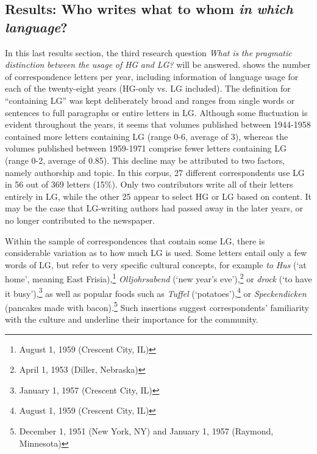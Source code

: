 \documentclass[output=paper]{langsci/langscibook}
\begin{document}
\subsection{Results: Who writes what to whom \textit{in} \textit{which} \textit{language}?} %
\label{sec:rocker:4.3}

 
In this last results section, the third research question \textit{What} \textit{is} \textit{the} \textit{pragmatic} \textit{distinction} \textit{between} \textit{the} \textit{usage} \textit{of} \textit{HG} \textit{and} \textit{LG?} will be answered.  shows the number of correspondence letters per year, including information of language usage for each of the twenty-eight years (HG-only vs. LG included). The definition for “containing LG” was kept deliberately broad and ranges from single words or sentences to full paragraphs or entire letters in LG. Although some fluctuation is evident throughout the years, it seems that volumes published between 1944-1958 contained more letters containing LG (range 0-6, average of 3), whereas the volumes published between 1959-1971 comprise fewer letters containing LG (range 0-2, average of 0.85). This decline may be attributed to two factors, namely authorship and topic. In this corpus, 27 different correspondents use LG in 56 out of 369 letters (15\%). Only two contributors write all of their letters entirely in LG, while the other 25 appear to select HG or LG based on content. It may be the case that LG-writing authors had passed away in the later years, or no longer contributed to the newspaper. 
 

 
Within the sample of correspondences that contain some LG, there is considerable variation as to how much LG is used. Some letters entail only a few words of LG, but refer to very specific cultural concepts, for example \textit{to} \textit{Hus} (‘at home’, meaning East Frisia),\footnote{August 1, 1959 (Crescent City, IL)} \textit{Olljohrsabend} (‘new year’s eve’),\footnote{April 1, 1953 (Diller, Nebraska)} or \textit{drock} (‘to have it busy’),\footnote{January 1, 1957 (Crescent City, IL)} as well as popular foods such as \textit{Tuffel} (‘potatoes’),\footnote{August 1, 1959 (Crescent City, IL)} or \textit{Speckendicken} (pancakes made with bacon).\footnote{December 1, 1951 (New York, NY) and January 1, 1957 (Raymond, Minnesota)} Such insertions suggest correspondents’ familiarity with the culture and underline their importance for the community. 

 
\end{document}

